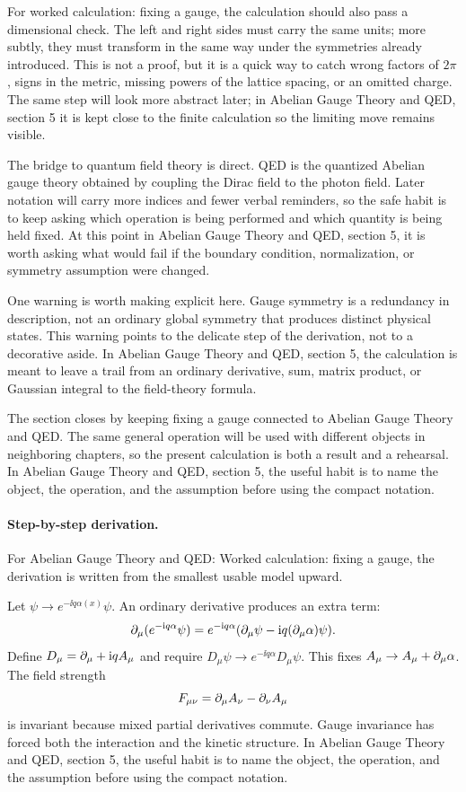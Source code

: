 For worked calculation: fixing a gauge, the calculation should also pass a dimensional check.  The left and right sides must carry the same units; more subtly, they must transform in the same way under the symmetries already introduced.  This is not a proof, but it is a quick way to catch wrong factors of \(2\pi\), signs in the metric, missing powers of the lattice spacing, or an omitted charge.  The same step will look more abstract later; in Abelian Gauge Theory and QED, section 5 it is kept close to the finite calculation so the limiting move remains visible.

The bridge to quantum field theory is direct.  QED is the quantized Abelian gauge theory obtained by coupling the Dirac field to the photon field.  Later notation will carry more indices and fewer verbal reminders, so the safe habit is to keep asking which operation is being performed and which quantity is being held fixed.  At this point in Abelian Gauge Theory and QED, section 5, it is worth asking what would fail if the boundary condition, normalization, or symmetry assumption were changed.

One warning is worth making explicit here.  Gauge symmetry is a redundancy in description, not an ordinary global symmetry that produces distinct physical states.  This warning points to the delicate step of the derivation, not to a decorative aside.  In Abelian Gauge Theory and QED, section 5, the calculation is meant to leave a trail from an ordinary derivative, sum, matrix product, or Gaussian integral to the field-theory formula.

The section closes by keeping fixing a gauge connected to Abelian Gauge Theory and QED.  The same general operation will be used with different objects in neighboring chapters, so the present calculation is both a result and a rehearsal.  In Abelian Gauge Theory and QED, section 5, the useful habit is to name the object, the operation, and the assumption before using the compact notation.



\paragraph{Step-by-step derivation.}

For Abelian Gauge Theory and QED: Worked calculation: fixing a gauge, the derivation is written from the smallest usable model upward.

Let \(\psi\to e^{-\ii q\alpha(x)}\psi\).  An ordinary derivative produces an extra term:
\[
  \partial_\mu(e^{-\mathrm i q\alpha}\psi)
  =
  e^{-\mathrm i q\alpha}(\partial_\mu\psi-\mathrm i q(\partial_\mu\alpha)\psi).
\]
Define \(D_\mu=\partial_\mu+\mathrm i qA_\mu\) and require \(D_\mu\psi\to e^{-\ii q\alpha}D_\mu\psi\).  This fixes \(A_\mu\to A_\mu+\partial_\mu\alpha\).  The field strength
\[
  F_{\mu\nu}=\partial_\mu A_\nu-\partial_\nu A_\mu
\]
is invariant because mixed partial derivatives commute.  Gauge invariance has forced both the interaction and the kinetic structure.  In Abelian Gauge Theory and QED, section 5, the useful habit is to name the object, the operation, and the assumption before using the compact notation.

